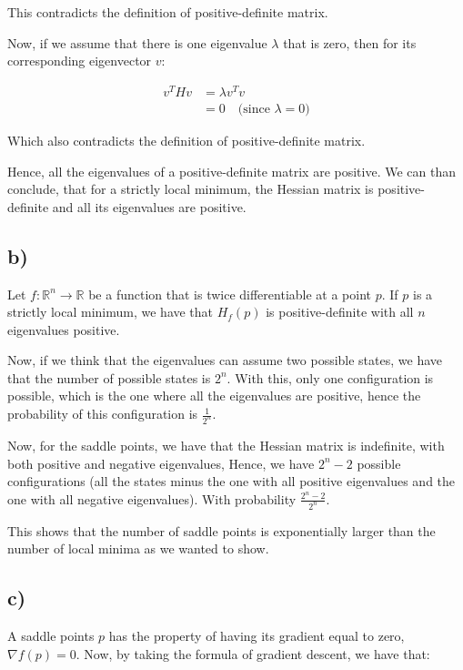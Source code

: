 \documentclass{article}
\begin{document}
This contradicts the definition of positive-definite matrix.

Now, if we assume that there is one eigenvalue $\lambda$ that is zero, then for its corresponding eigenvector $v$:

\begin{align*}
    v^T H v &= \lambda v^T v \\
    &= 0 \quad \text{(since $\lambda = 0$)}
\end{align*}

Which also contradicts the definition of positive-definite matrix.

Hence, all the eigenvalues of a positive-definite matrix are positive. We can than conclude, that
for a strictly local minimum, the Hessian matrix is positive-definite and all its eigenvalues are positive.

\subsection*{b)}

Let $f: \mathbb{R}^n \rightarrow \mathbb{R}$ be a function that is twice differentiable at a point $p$. If $p$
is a strictly local minimum, we have that $H_f(p)$ is positive-definite with all $n$ eigenvalues positive.

Now, if we think that the eigenvalues can assume two possible states, we have that the number of possible states is $2^n$.
With this, only one configuration is possible, which is the one where all the eigenvalues are positive, hence
the probability of this configuration is $\frac{1}{2^n}$.

Now, for the saddle points, we have that the Hessian matrix is indefinite, with both positive and negative eigenvalues, Hence,
we have $2^n - 2$ possible configurations (all the states minus the one with all positive eigenvalues and the one with all negative eigenvalues). With
probability $\frac{2^n - 2}{2^n}$. 

This shows that the number of saddle points is exponentially larger than the number of local minima as
we wanted to show.

\subsection*{c)}

A saddle points $p$ has the property of having its gradient equal to zero, $\nabla f(p) = 0$.
Now, by taking the formula of gradient descent, we have that:
\end{document}
